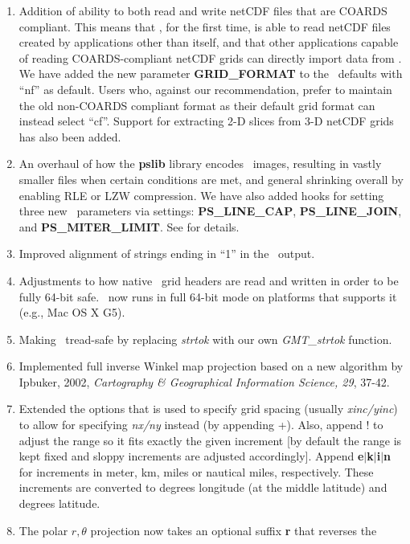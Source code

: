 \begin{enumerate}
\item Addition of ability to both read and write netCDF files that are COARDS compliant.  This means
that \GMT, for the first time, is able to read netCDF files created by applications other than itself,
and that other applications capable of reading COARDS-compliant netCDF grids can directly import data
from \GMT.  We have added the new parameter \textbf{GRID\_FORMAT} to the  \GMT\ defaults with ``nf'' as default.
Users who, against our recommendation, prefer to maintain the old non-COARDS compliant format as their
default grid format can instead select ``cf''. Support for extracting 2-D slices from 3-D netCDF grids has
also been added.
\item An overhaul of how the \textbf{pslib} library encodes \PS\ images, resulting in vastly smaller files when
certain conditions are met, and general shrinking overall by enabling RLE or LZW compression.  We
have also added hooks for setting three new \PS\ parameters via  settings:
\textbf{PS\_LINE\_CAP}, \textbf{PS\_LINE\_JOIN}, and \textbf{PS\_MITER\_LIMIT}. See  for details.
\item Improved alignment of strings ending in ``1'' in the \PS\ output.
\item Adjustments to how native \GMT\ grid headers are read and written in order to be fully 64-bit safe.
\GMT\ now runs in full 64-bit mode on platforms that supports it (e.g., Mac OS X G5).
\item Making \GMT\ tread-safe by replacing \emph{strtok} with our own \emph{GMT\_strtok} function.
\item Implemented full inverse Winkel map projection based on a new algorithm by Ipbuker, 2002,
\emph{Cartography \& Geographical Information Science, 29}, 37-42.
\item Extended the options that is used to specify grid spacing (usually \emph{xinc/yinc}) to allow for
specifying \emph{nx/ny} instead (by appending +).  Also, append ! to adjust the range so it fits exactly the
given increment [by default the range is kept fixed and sloppy increments are adjusted accordingly].
Append \textbf{e}$|$\textbf{k}$|$\textbf{i}$|$\textbf{n} for increments in meter, km, miles
or nautical miles, respectively.  These increments are converted to degrees
longitude (at the middle latitude) and degrees latitude.
\item The polar $r, \theta$ projection  now takes an optional suffix \textbf{r} that reverses the

\end{enumerate}

